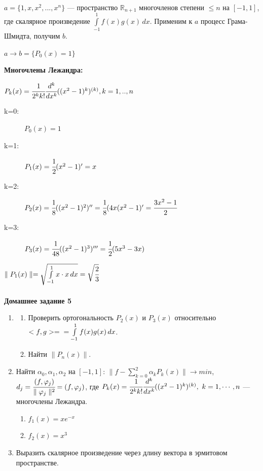 \documentclass[12pt]{article}
\theoremstyle{definition}
\numberwithin{equation}{section}
\begin{document}
\\
$a = \{1, x, x^2,..., x^n\}$ --- пространство $\mathbb{R}_{n+1}$ многочленов степени $\leqslant n$ на $[-1, 1]$, где скалярное произведение $\int\limits_{-1}^1 f(x)g(x)\,dx$. Применим к $a$ процесс Грама-Шмидта, получим $b$.\begin{center}
$a \to b = \{P_0(x)=1\}$\end{center}
\textbf{Многочлены Лежандра:} \begin{center}$P_k(x) = \cfrac{1}{2^k k!}\cfrac{d^k}{dx^k}((x^2-1)^k)^{(k)}, k=1,..,n$\end{center}\begin{description} 
\item[k=0:] $P_0(x)=1$
\item[k=1:] $P_1(x)=\cfrac{1}{2}(x^2-1)'=x$
\item[k=2:] $P_2(x)=\cfrac{1}{8}((x^2-1)^2)''=\cfrac{1}{8}(4x(x^2-1)'=\cfrac{3x^2-1}{2}$
\item[k=3:] $P_3(x)=\cfrac{1}{48}((x^2-1)^3)'''=\cfrac{1}{2}(5x^3-3x)$\end{description}
$\parallel P_1(x) \parallel = \sqrt{\int\limits_{-1}^1 x \cdot x\,dx} = \sqrt{\cfrac{2}{3}}$\\
\\
\textbf{Домашнее задание 5}\begin{enumerate}
\item
\begin{enumerate}
\item Проверить ортогональность $P_2(x)$ и $P_3(x)$ относительно $<f, g> =\\= \int\limits_{-1}^1 f(x)g(x)\,dx$.
\item Найти $\parallel P_n(x) \parallel$.
\end{enumerate}
\item
Найти $\alpha_0, \alpha_1, \alpha_2$ на $[-1, 1]$: $\parallel f - \sum\limits_{k=0}^2 \alpha_kP_k(x) \parallel \to min$, $d_j=\cfrac{(f, \varphi_j)}{\parallel \varphi_j \parallel^2} = (f, \varphi_j)$, где $P_k(x)=\cfrac{1}{2^k k!}\cfrac{d^k}{dx^k}((x^2-1)^k)^{(k)},~k=1,\cdots, n$ --- многочлены Лежандра.
\begin{enumerate}
\item $f_1(x)=xe^{-x}$
\item $f_2(x)=x^3$\\
\end{enumerate}
\item
Выразить скалярное произведение через длину вектора в эрмитовом пространстве.\end{enumerate}
\end{document}
